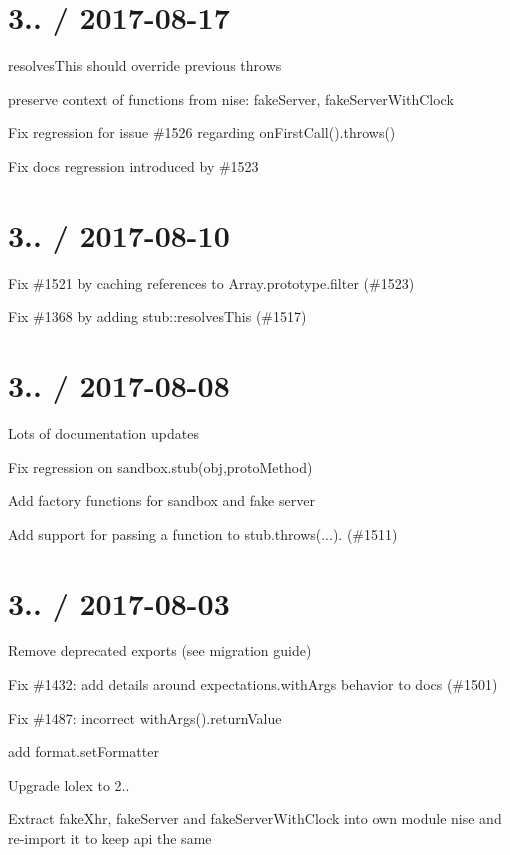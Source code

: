 \section*{3.. / 2017-\/08-\/17 }


\begin{DoxyItemize}
\item resolves\+This should override previous throws
\item preserve context of functions from nise\+: fake\+Server, fake\+Server\+With\+Clock
\item Fix regression for issue \#1526 regarding on\+First\+Call().throws()
\item Fix docs regression introduced by \#1523
\end{DoxyItemize}

\section*{3.. / 2017-\/08-\/10 }


\begin{DoxyItemize}
\item Fix \#1521 by caching references to Array.\+prototype.\+filter (\#1523)
\item Fix \#1368 by adding stub\+::resolves\+This (\#1517)
\end{DoxyItemize}

\section*{3.. / 2017-\/08-\/08 }


\begin{DoxyItemize}
\item Lots of documentation updates
\item Fix regression on sandbox.\+stub(obj,proto\+Method)
\item Add factory functions for sandbox and fake server
\item Add support for passing a function to stub.\+throws(...). (\#1511)
\end{DoxyItemize}

\section*{3.. / 2017-\/08-\/03 }


\begin{DoxyItemize}
\item Remove deprecated exports (see migration guide)
\item Fix \#1432\+: add details around expectations.\+with\+Args behavior to docs (\#1501)
\item Fix \#1487\+: incorrect with\+Args().return\+Value
\item add format.\+set\+Formatter
\item Upgrade lolex to 2..
\item Extract fake\+Xhr, fake\+Server and fake\+Server\+With\+Clock into own module {\ttfamily nise} and re-\/import it to keep api the same
\end{DoxyItemize}

